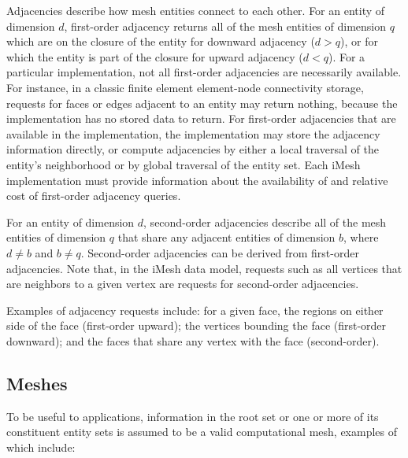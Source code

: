 Adjacencies describe how mesh entities connect to each other. For an
entity of dimension $d$, first-order adjacency returns all of the mesh
entities of dimension $q$ which are on the closure of the entity for
downward adjacency ($d>q$), or for which the entity is part of the
closure for upward adjacency ($d<q$). For a particular implementation,
not all first-order adjacencies are necessarily available.  For
instance, in a classic finite element element-node connectivity storage,
requests for faces or edges adjacent to an entity may return nothing,
because the implementation has no stored data to return.  For
first-order adjacencies that are available in the implementation, the
implementation may store the adjacency information directly, or compute
adjacencies by either a local traversal of the entity's neighborhood or
by global traversal of the entity set. Each iMesh implementation
must provide information about the availability of and relative cost of
first-order adjacency queries.

For an entity of dimension $d$, second-order adjacencies describe
all of the mesh entities of dimension $q$ that share any adjacent
entities of dimension $b$, where $d\neq b$ and $b\neq q$. Second-order
adjacencies can be derived from first-order adjacencies. Note that,
in the iMesh data model, requests such as all vertices that are neighbors
to a given vertex are requests for second-order adjacencies.

Examples of adjacency requests include: for a given face, the regions
on either side of the face (first-order upward); the vertices bounding
the face (first-order downward); and the faces that share any vertex
with the face (second-order). 


\subsection{Meshes\label{sub:Meshes}}

To be useful to applications, information
in the root set or one or more of its constituent entity sets is assumed
to be a valid computational mesh, examples of which include: 

